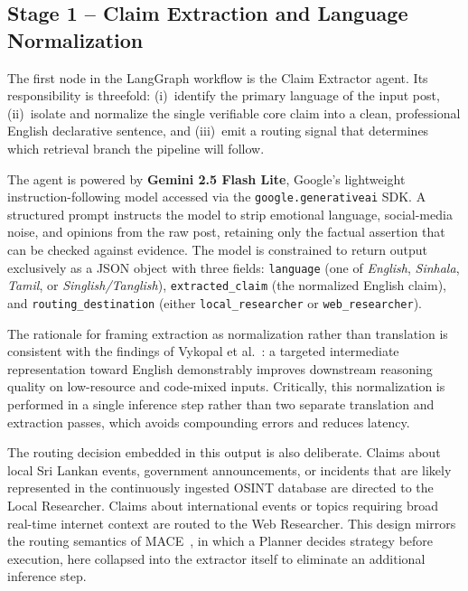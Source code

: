 \documentclass[12pt,a4paper]{article}
\begin{document}
\subsection{Stage 1 -- Claim Extraction and Language Normalization}
\label{subsec:extraction}

The first node in the LangGraph workflow is the Claim Extractor agent. Its
responsibility is threefold: (i)~identify the primary language of the input
post, (ii)~isolate and normalize the single verifiable core claim into a
clean, professional English declarative sentence, and (iii)~emit a routing
signal that determines which retrieval branch the pipeline will follow.

The agent is powered by \textbf{Gemini 2.5 Flash Lite}, Google's lightweight
instruction-following model accessed via the \texttt{google.generativeai}
SDK. A structured prompt instructs the model to strip emotional language,
social-media noise, and opinions from the raw post, retaining only the
factual assertion that can be checked against evidence. The model is
constrained to return output exclusively as a JSON object with three fields:
\texttt{language} (one of \textit{English}, \textit{Sinhala},
\textit{Tamil}, or \textit{Singlish/Tanglish}), \texttt{extracted\_claim}
(the normalized English claim), and \texttt{routing\_destination} (either
\texttt{local\_researcher} or \texttt{web\_researcher}).

The rationale for framing extraction as normalization rather than translation
is consistent with the findings of Vykopal et al.~\cite{vykopal}: a targeted
intermediate representation toward English demonstrably improves downstream
reasoning quality on low-resource and code-mixed inputs. Critically, this
normalization is performed in a single inference step rather than two
separate translation and extraction passes, which avoids compounding errors
and reduces latency.

The routing decision embedded in this output is also deliberate. Claims about
local Sri Lankan events, government announcements, or incidents that are
likely represented in the continuously ingested OSINT database are directed
to the Local Researcher. Claims about international events or topics
requiring broad real-time internet context are routed to the Web Researcher.
This design mirrors the routing semantics of MACE~\cite{mace}, in which a
Planner decides strategy before execution, here collapsed into the extractor
itself to eliminate an additional inference step.
\end{document}

